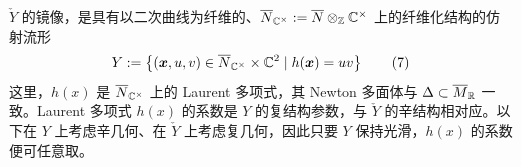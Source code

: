 $\check Y$ 的镜像，是具有以二次曲线为纤维的、$\overline{N}_{\mathbb{C}^\times}:=\overline{N}\otimes_{\mathbb{Z}}\mathbb{C}^\times$ 上的纤维化结构的仿射流形
\begin{equation}
Y:=\left\{(\bm{x},u,v)\in\overline{N}_{\mathbb{C}^\times}\times\mathbb{C}^2\mid h(\bm{x})=uv\right\}
\tag{7}
\end{equation}
\noindent 这里，$h(x)$ 是 $\overline{N}_{\mathbb{C}^\times}$ 上的 Laurent 多项式，其 Newton 多面体与 $\Delta\subset\overline{M}_{\mathbb{R}}$ 一致。Laurent 多项式 $h(x)$ 的系数是 $Y$ 的复结构参数，与 $\check Y$ 的辛结构相对应。以下在 $Y$ 上考虑辛几何、在 $\check Y$ 上考虑复几何，因此只要 $Y$ 保持光滑，$h(x)$ 的系数便可任意取。

